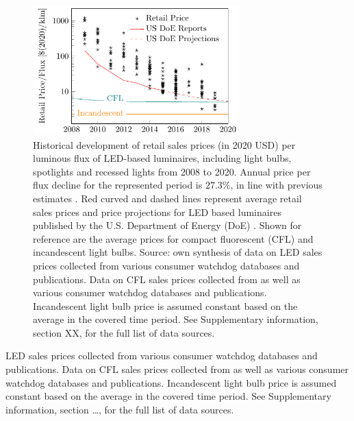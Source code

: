\documentclass[twoside,twocolumn,9pt]{article}
\begin{document}
\begin{figure}
\centering
  \includegraphics[height=5cm]{2_SSL_EES/article/figures/cost_lamp_small.pdf}
  \caption{Historical development of retail sales prices (in 2020 USD) per luminous flux of LED-based luminaires, including light bulbs, spotlights and recessed lights from 2008 to 2020. Annual price per flux decline for the represented period is $27.3\%$, in line with previous estimates \cite{Gerke2020}. Red curved and dashed lines represent average retail sales prices and price projections for LED based luminaires published by the U.S. Department of Energy (DoE) \cite{ council2013assessment}. Shown for reference are the average prices for compact fluorescent (CFL) and incandescent light bulbs. Source: own synthesis of data on LED sales prices collected from various consumer watchdog databases and publications. Data on CFL sales prices collected from \cite{eger2018origin} as well as various consumer watchdog databases and publications. Incandescent light bulb price is assumed constant based on the average in the covered time period. See Supplementary information, section XX, for the full list of data sources.}
  \label{fgr:cost_lamp_small}
\end{figure}

LED sales prices collected from various consumer watchdog databases and publications. Data on CFL sales prices collected from \cite{eger2018origin} as well as various consumer watchdog databases and publications. Incandescent light bulb price is assumed constant based on the average in the covered time period. See Supplementary information, section …, for the full list of data sources.
\end{document}
